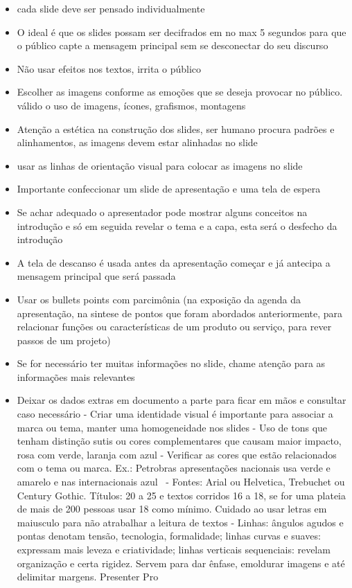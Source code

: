 \begin{itemize}
    \item cada slide deve ser pensado individualmente
    \item O ideal é que os slides possam ser decifrados em no max 5 segundos para que o público capte a mensagem principal sem se desconectar do seu discurso
    \item Não usar efeitos nos textos, irrita o público
    \item Escolher as imagens conforme as emoções que se deseja provocar no público. válido o uso de imagens, ícones, grafismos, montagens
    \item Atenção a estética na construção dos slides, ser humano procura padrões e alinhamentos, as imagens devem estar alinhadas no slide
    \item usar as linhas de orientação visual para colocar as imagens no slide
    \item Importante confeccionar um slide de apresentação e uma tela de espera
    \item Se achar adequado o apresentador pode mostrar alguns conceitos na introdução e só em seguida revelar o tema e a capa, esta será o desfecho da introdução
    \item A tela de descanso é usada antes da apresentação começar e já antecipa a mensagem principal que será passada
    \item Usar os bullets points com parcimônia (na exposição da agenda da apresentação, na sintese de pontos que foram abordados anteriormente, para relacionar funções ou características de um produto ou serviço, para rever passos de um projeto)
    \item Se for necessário ter muitas informações no slide, chame atenção para as informações mais relevantes
    \item Deixar os dados extras em documento a parte para ficar em mãos e consultar caso necessário
- Criar uma identidade visual é importante para associar a marca ou tema, manter uma homogeneidade nos slides
- Uso de tons que tenham distinção sutis ou cores complementares que causam maior impacto, rosa com verde, laranja com azul
- Verificar as cores que estão relacionados com o tema ou marca. Ex.: Petrobras apresentações nacionais usa verde e amarelo e nas internacionais azul 
- Fontes: Arial ou Helvetica, Trebuchet ou Century Gothic. Títulos: 20 a 25 e textos corridos 16 a 18, se for uma plateia de mais de 200 pessoas usar 18 como mínimo. Cuidado ao usar letras em maiusculo para não atrabalhar a leitura de textos
- Linhas: ângulos agudos e pontas denotam tensão, tecnologia, formalidade; linhas curvas e suaves: expressam mais leveza e criatividade; linhas verticais sequenciais: revelam organização e certa rigidez. Servem para dar ênfase, emoldurar imagens e até delimitar margens. Presenter Pro 

\end{itemize}
